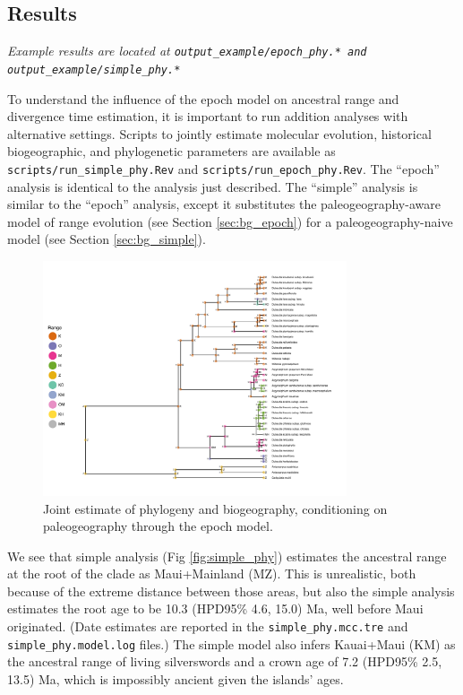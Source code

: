 \subsection{Results}

\begin{center}
{\it Example results are located at \tt{output\_example/epoch\_phy.*} and \tt{output\_example/simple\_phy.*} }
\end{center}

To understand the influence of the epoch model on ancestral range and divergence time estimation, it is important to run addition analyses with alternative settings.
Scripts to jointly estimate molecular evolution, historical biogeographic, and phylogenetic parameters are available as {\tt scripts/run\_simple\_phy.Rev} and {\tt scripts/run\_epoch\_phy.Rev}.
The ``epoch'' analysis is identical to the analysis just described.
The ``simple'' analysis is similar to the ``epoch'' analysis, except it substitutes the paleogeography-aware model of range evolution (see Section \ref{sec:bg_epoch}) for a paleogeography-naive model (see Section \ref{sec:bg_simple}).

\begin{figure}[!h]
\centering
\includegraphics[width=0.8\textwidth]{figures/fig_epoch_phy_RevGadgets_ase.pdf} 
\caption{Joint estimate of phylogeny and biogeography, conditioning on paleogeography through the epoch model.}
\label{fig:epoch_phy}
\end{figure}

We see that simple analysis (Fig \ref{fig:simple_phy}) estimates the ancestral range at the root of the clade as Maui+Mainland (MZ).
This is unrealistic, both because of the extreme distance between those areas, but also the simple analysis estimates the root age to be 10.3 (HPD95\% 4.6, 15.0) Ma, well before Maui originated.
(Date estimates are reported in the {\tt simple\_phy.mcc.tre} and {\tt simple\_phy.model.log} files.)
The simple model also infers Kauai+Maui (KM) as the ancestral range of living silverswords and a crown age of 7.2 (HPD95\% 2.5, 13.5) Ma, which is impossibly ancient given the islands' ages.

